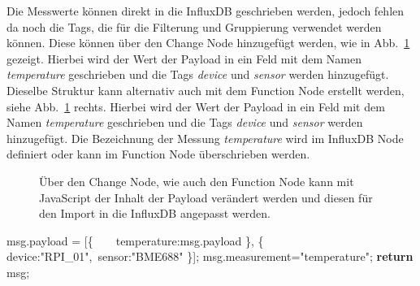 \documentclass[
  11pt,
  a4paperpaper,
  oneside, openany  ,captions=tableheading
]{scrbook}
\newenvironment{Shaded}{\begin{snugshade}}{\end{snugshade}}
\newcommand{\AttributeTok}[1]{\textcolor[rgb]{0.40,0.45,0.13}{#1}}
\newcommand{\ControlFlowTok}[1]{\textcolor[rgb]{0.00,0.23,0.31}{\textbf{#1}}}
\newcommand{\DataTypeTok}[1]{\textcolor[rgb]{0.68,0.00,0.00}{#1}}
\newcommand{\NormalTok}[1]{\textcolor[rgb]{0.00,0.23,0.31}{#1}}
\newcommand{\OperatorTok}[1]{\textcolor[rgb]{0.37,0.37,0.37}{#1}}
\newcommand{\StringTok}[1]{\textcolor[rgb]{0.13,0.47,0.30}{#1}}
\theoremstyle{definition}
\theoremstyle{remark}
\newcommand*\circled[1]{\tikz[baseline=(char.base)]{
          \node[shape=circle,draw,inner sep=1pt] (char) {{\scriptsize#1}};}}
\begin{document}
Die Messwerte können direkt in die InfluxDB geschrieben werden, jedoch
fehlen da noch die Tags, die für die Filterung und Gruppierung verwendet
werden können. Diese können über den Change Node hinzugefügt werden, wie
in Abb.~\ref{fig-noderedpayload} gezeigt. Hierbei wird der Wert der
Payload in ein Feld mit dem Namen \emph{temperature} geschrieben und die
Tags \emph{device} und \emph{sensor} werden hinzugefügt. Dieselbe
Struktur kann alternativ auch mit dem Function Node erstellt werden,
siehe Abb.~\ref{fig-noderedpayload} rechts. Hierbei wird der Wert der
Payload in ein Feld mit dem Namen \emph{temperature} geschrieben und die
Tags \emph{device} und \emph{sensor} werden hinzugefügt. Die Bezeichnung
der Messung \emph{temperature} wird im InfluxDB Node definiert oder kann
im Function Node überschrieben werden.

\begin{figure}


\caption{\label{fig-noderedpayload}Über den Change Node, wie auch den
Function Node kann mit JavaScript der Inhalt der Payload verändert
werden und diesen für den Import in die InfluxDB angepasst werden.}

\end{figure}%

\label{annotated-cell-39}%
\begin{Shaded}
\begin{Highlighting}[]
\NormalTok{msg}\OperatorTok{.}\AttributeTok{payload} \OperatorTok{=}\NormalTok{ [\{ }
    \DataTypeTok{temperature}\OperatorTok{:}\NormalTok{msg}\OperatorTok{.}\AttributeTok{payload} \hspace*{\fill}\NormalTok{\circled{1}}
\NormalTok{\}}\OperatorTok{,}\NormalTok{ \{ }\DataTypeTok{device}\OperatorTok{:}\StringTok{"RPI\_01"}\OperatorTok{,}\DataTypeTok{ sensor}\OperatorTok{:}\StringTok{"BME688"}\NormalTok{ \}]}\OperatorTok{;} \hspace*{\fill}\NormalTok{\circled{2}}
\NormalTok{msg}\OperatorTok{.}\AttributeTok{measurement}\OperatorTok{=}\StringTok{"temperature"}\OperatorTok{;} \hspace*{\fill}\NormalTok{\circled{3}}
\ControlFlowTok{return}\NormalTok{ msg}\OperatorTok{;}
\end{Highlighting}
\end{Shaded}
\end{document}
